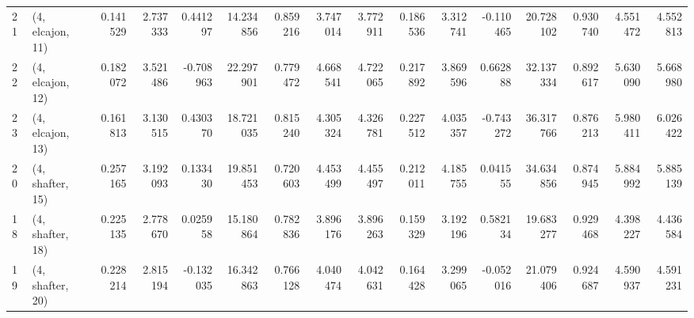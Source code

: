 \begin{tabular}{llrrrrrrrrrrrrrr}
21 &  (4, elcajon, 11) &   0.141529 &  2.737333 &  0.441297 &  14.234856 &  0.859216 &   3.747014 &  3.772911 &  0.186536 &  3.312741 & -0.110465 &   20.728102 &  0.930740 &   4.551472 &   4.552813 \\
22 &  (4, elcajon, 12) &   0.182072 &  3.521486 & -0.708963 &  22.297901 &  0.779472 &   4.668541 &  4.722065 &  0.217892 &  3.869596 &  0.662888 &   32.137334 &  0.892617 &   5.630090 &   5.668980 \\
23 &  (4, elcajon, 13) &   0.161813 &  3.130515 &  0.430370 &  18.721035 &  0.815240 &   4.305324 &  4.326781 &  0.227512 &  4.035357 & -0.743272 &   36.317766 &  0.876213 &   5.980411 &   6.026422 \\
20 &  (4, shafter, 15) &   0.257165 &  3.192093 &  0.133430 &  19.851453 &  0.720603 &   4.453499 &  4.455497 &  0.212011 &  4.185755 &  0.041555 &   34.634856 &  0.874945 &   5.884992 &   5.885139 \\
18 &  (4, shafter, 18) &   0.225135 &  2.778670 &  0.025958 &  15.180864 &  0.782836 &   3.896176 &  3.896263 &  0.159329 &  3.192196 &  0.582134 &   19.683277 &  0.929468 &   4.398227 &   4.436584 \\
19 &  (4, shafter, 20) &   0.228214 &  2.815194 & -0.132035 &  16.342863 &  0.766128 &   4.040474 &  4.042631 &  0.164428 &  3.299065 & -0.052016 &   21.079406 &  0.924687 &   4.590937 &   4.591231 \\
\bottomrule
\end{tabular}
